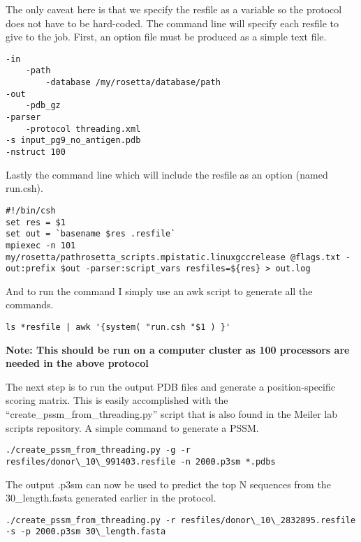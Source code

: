 The only caveat here is that we specify the resfile as a variable so the protocol does not have to be hard-coded. The command line will specify each resfile to give to the job. First, an option file must be produced as a simple text file.


\begin{lstlisting}[breaklines=true]
-in
    -path
        -database /my/rosetta/database/path
-out
    -pdb_gz
-parser
    -protocol threading.xml
-s input_pg9_no_antigen.pdb
-nstruct 100
\end{lstlisting}

Lastly the command line which will include the resfile as an option (named run.csh).

\begin{lstlisting}[breaklines=true]
#!/bin/csh
set res = $1
set out = `basename $res .resfile`
mpiexec -n 101 my/rosetta/pathrosetta_scripts.mpistatic.linuxgccrelease @flags.txt -out:prefix $out -parser:script_vars resfiles=${res} > out.log
\end{lstlisting}

And to run the command I simply use an awk script to generate all the commands.

\begin{lstlisting}[breaklines=true]
ls *resfile | awk '{system( "run.csh "$1 ) }'
\end{lstlisting}

\textbf{Note: This should be run on a computer cluster as 100 processors are needed in the above protocol}

The next step is to run the output PDB files and generate a position-specific scoring matrix. This is easily accomplished with the ``create\_pssm\_from\_threading.py'' script that is also found in the Meiler lab scripts repository. A simple command to generate a PSSM.

\begin{lstlisting}[breaklines=true]
./create_pssm_from_threading.py -g -r resfiles/donor\_10\_991403.resfile -n 2000.p3sm *.pdbs
\end{lstlisting}

The output .p3sm can now be used to predict the top N sequences from the 30\_length.fasta generated earlier in the protocol.

\begin{lstlisting}[breaklines=true]
./create_pssm_from_threading.py -r resfiles/donor\_10\_2832895.resfile -s -p 2000.p3sm 30\_length.fasta
\end{lstlisting}

